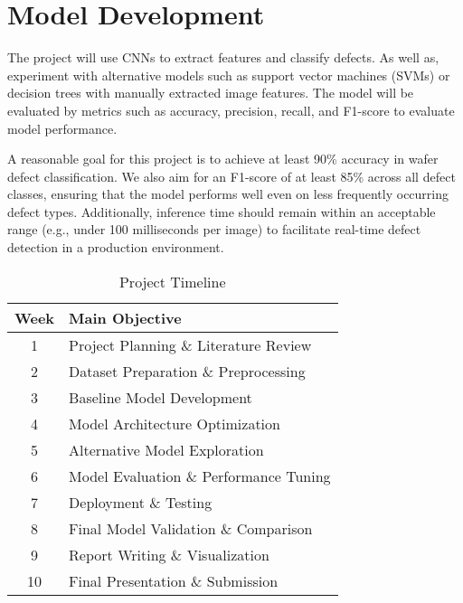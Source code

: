\documentclass[conference]{IEEEtran}
\begin{document}

\section{Model Development} 
The project will use CNNs to extract features and classify defects. As well as, experiment with alternative models such as support vector machines (SVMs) or decision trees with manually extracted image features.
The model will be evaluated by metrics such as accuracy, precision, recall, and F1-score to evaluate model performance.

A reasonable goal for this project is to achieve at least 90\% accuracy in wafer defect classification. 
We also aim for an F1-score of at least 85\% across all defect classes, ensuring that the model performs well even on less frequently occurring defect types. 
Additionally, inference time should remain within an acceptable range (e.g., under 100 milliseconds per image) to facilitate real-time defect detection in a production environment.

\begin{table}[h]
    \centering
    \caption{Project Timeline}
    \begin{tabular}{|c|l|}
    \hline
    \textbf{Week} & \textbf{Main Objective} \\ \hline
    1 & Project Planning \& Literature Review \\ \hline
    2 & Dataset Preparation \& Preprocessing \\ \hline
    3 & Baseline Model Development \\ \hline
    4 & Model Architecture Optimization \\ \hline
    5 & Alternative Model Exploration \\ \hline
    6 & Model Evaluation \& Performance Tuning \\ \hline
    7 & Deployment \& Testing \\ \hline
    8 & Final Model Validation \& Comparison \\ \hline
    9 & Report Writing \& Visualization \\ \hline
    10 & Final Presentation \& Submission \\ \hline
    \end{tabular}
    \label{tab:project_timeline}
\end{table}
\end{document}
